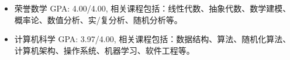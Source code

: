 
\begin{itemize}[nosep]
  \item 荣誉数学 GPA: 4.00/4.00, 相关课程包括：线性代数、抽象代数、数学建模、概率论、数值分析、实/复分析、随机分析等。
  \item 计算机科学 GPA: 3.97/4.00, 相关课程包括：数据结构、算法、随机化算法、计算机架构、操作系统、机器学习、软件工程等。
\end{itemize}

